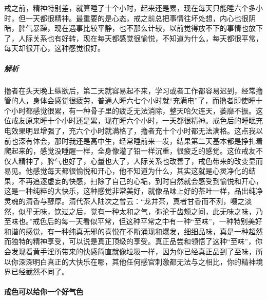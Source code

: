 \begin{case}
    戒之前，精神特别差，就算睡了十个小时，起来还是累，现在每天只能睡六个多小时，但一天都很精神。最重要的是心态，戒之前总把事情往坏处想，内心也很阴暗，脾气暴躁，现在遇事比较平静，也不那么计较，以前觉得放不下的事情也放下了，人际关系也有好转，现在每天都感觉很愉悦，不知道为什么，每天都很平常，每天却很开心，这种感觉很好。
    \subparagraph{解析} 撸者在头天晚上纵欲后，第二天就容易起不来，学习或者工作都容易迟到，经常撸管的人，身体会感觉很疲劳，普通人睡六七个小时就“充满电”了，而撸者即使睡十个小时都感觉很累，有一种骨子里的疲乏无法消除，整天哈欠连天，萎靡不振。这位戒友原来睡十个小时还是累，现在睡六个小时，一天都很精神。戒色后的睡眠充电效果明显增强了，充六个小时就满格了，撸者充十个小时都无法满格。这点我以前也深有体会，那时我还是高中生，经常睡前来一发，结果第二天基本都是挣扎着爬起来的，感觉没睡醒一样，全身像灌了铅一样沉重，很疲乏的感觉。这位戒友不仅人精神了，脾气也好了，心量也大了，人际关系也改善了，戒色带来的改变显而易见。他感觉每天都很愉悦和开心，他不知道为什么，其实这就是心灵净化的结果，不再追逐虚妄的快感，扫除了自己的心垢，到时自然就会感受到愉悦和开心，这是一种纯粹的大快乐，这种感觉非常美好，就像品味上好的茶叶一样，品出纯净灵魂的清香与醇厚。清代茶人陆次之曾云：“龙井茶，真者甘香而不洌，啜之淡然，似乎无味，饮过之后，觉有一种太和之气，弥沦于齿颊之间，此无味之味，乃至味也。”戒色后的每一天看似平常，但这种平常之中有一种“至味”，一种特别美好和谐的感觉，有一种纯真无邪的喜悦在不断涌现和爆发，细细品味，真是一种超然而独特的精神享受，可以说是真正顶级的享受。真正品尝和领悟了这种“至味”，你会发现看黄手淫所带来的快感简直就像垃圾一样，因为你已经真正品到了至味，所以你深深明白真正的大快乐在哪，其他任何感官刺激都无法与之相比，你的精神境界已经截然不同了。
\end{case}

\paragraph{戒色可以给你一个好气色}

